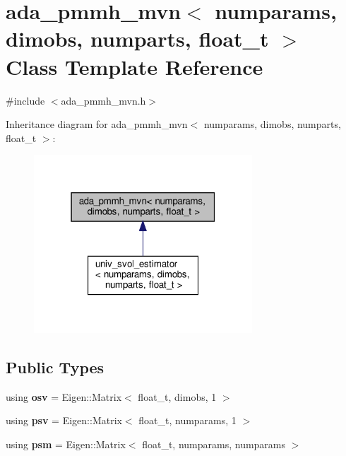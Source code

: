 \hypertarget{classada__pmmh__mvn}{}\section{ada\+\_\+pmmh\+\_\+mvn$<$ numparams, dimobs, numparts, float\+\_\+t $>$ Class Template Reference}
\label{classada__pmmh__mvn}


{\ttfamily \#include $<$ada\+\_\+pmmh\+\_\+mvn.\+h$>$}



Inheritance diagram for ada\+\_\+pmmh\+\_\+mvn$<$ numparams, dimobs, numparts, float\+\_\+t $>$\+:
\nopagebreak
\begin{figure}[H]
\begin{center}
\leavevmode
\includegraphics[width=232pt]{classada__pmmh__mvn__inherit__graph}
\end{center}
\end{figure}
\subsection*{Public Types}
\begin{DoxyCompactItemize}
\item 
\mbox{\label{classada__pmmh__mvn_af036f732a29ede6fee08cdaacc9bbaaa}} 
using {\bfseries osv} = Eigen\+::\+Matrix$<$ float\+\_\+t, dimobs, 1 $>$
\item 
\mbox{\label{classada__pmmh__mvn_adb9df4d2086af9cace0f8aeebd805a73}} 
using {\bfseries psv} = Eigen\+::\+Matrix$<$ float\+\_\+t, numparams, 1 $>$
\item 
\mbox{\label{classada__pmmh__mvn_a1cb69e6998319cbe2733965a177dc8d1}} 
using {\bfseries psm} = Eigen\+::\+Matrix$<$ float\+\_\+t, numparams, numparams $>$
\end{DoxyCompactItemize}
